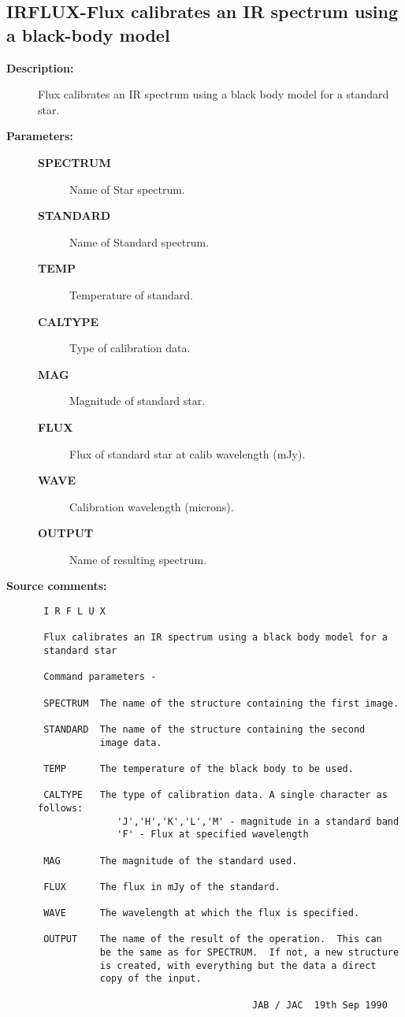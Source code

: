 \subsection{IRFLUX-\label{IRFLUX}Flux calibrates an IR spectrum using a black-body model}
\begin{description}

\item [{\bf Description:}]
 Flux calibrates an IR spectrum using a black body model for a
 standard star.

\item [{\bf Parameters:}]
\begin{description}
\item [{\bf SPECTRUM}]
 Name of Star spectrum.
\item [{\bf STANDARD}]
 Name of Standard spectrum.
\item [{\bf TEMP}]
 Temperature of standard.
\item [{\bf CALTYPE}]
 Type of calibration data.
\item [{\bf MAG}]
 Magnitude of standard star.
\item [{\bf FLUX}]
 Flux of standard star at calib wavelength (mJy).
\item [{\bf WAVE}]
 Calibration wavelength (microns).
\item [{\bf OUTPUT}]
 Name of resulting spectrum.
\end{description}

\item [{\bf Source comments:}]
\begin{verbatim}
 I R F L U X

 Flux calibrates an IR spectrum using a black body model for a
 standard star

 Command parameters -

 SPECTRUM  The name of the structure containing the first image.

 STANDARD  The name of the structure containing the second
           image data.

 TEMP      The temperature of the black body to be used.

 CALTYPE   The type of calibration data. A single character as follows:
              'J','H','K','L','M' - magnitude in a standard band
              'F' - Flux at specified wavelength

 MAG       The magnitude of the standard used.

 FLUX      The flux in mJy of the standard.

 WAVE      The wavelength at which the flux is specified.

 OUTPUT    The name of the result of the operation.  This can
           be the same as for SPECTRUM.  If not, a new structure
           is created, with everything but the data a direct
           copy of the input.

                                      JAB / JAC  19th Sep 1990
\end{verbatim}
\end{description}
